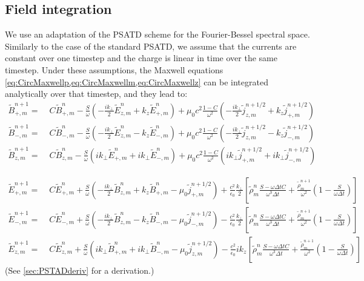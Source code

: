 \documentclass[a4paper]{article}   	%
\newcommand{\tB}[2]{\tilde{B}_{#1,m}^{#2}}
\newcommand{\tE}[2]{\tilde{E}_{#1,m}^{#2}}
\newcommand{\tj}[2]{\tilde{j}_{#1,m}^{#2}}
\newcommand{\trho}[1]{\tilde{\rho}_{m}^{#1}}
\begin{document}
\subsection{Field integration}
\label{sec:FieldIntegration}

We use an adaptation of the PSATD scheme \cite{Haber} for the
Fourier-Bessel spectral space. Similarly to the case of the standard
PSATD, we assume that the currents are constant over one timestep and
the charge is linear in time over the same timestep. Under these
assumptions, the Maxwell equations \cref{eq:CircMaxwellp,eq:CircMaxwellm,eq:CircMaxwellz} can be integrated
analytically over that timestep, and they lead to:
\begin{align*}
\tB{+}{n+1} = \; & C \tB{+}{n} - 
\frac{S}{\omega}\left(-\frac{ik_\perp }{2} \tE{z}{n} + k_z\tE{+}{n}
\right) + \mu_0 c^2\frac{1-C}{\omega^2} \left( -\frac{ik_\perp }{2}
  \tj{z}{n+1/2} + k_z \tj{+}{n+1/2} \right)& \\
\tB{-}{n+1} =\; & C \tB{-}{n} - 
\frac{S}{\omega}\left(- \frac{ik_\perp }{2} \tE{z}{n} - k_z\tE{-}{n}
\right) + \mu_0 c^2\frac{1-C}{\omega^2} \left( - \frac{ik_\perp }{2}
  \tj{z}{n+1/2} - k_z \tj{-}{n+1/2} \right) &\\
\tB{z}{n+1} =\; & C \tB{z}{n} - 
\frac{S}{\omega}\left(ik_\perp \tE{+}{n} + ik_\perp \tE{-}{n}
\right) + \mu_0 c^2\frac{1-C}{\omega^2} \left( ik_\perp
  \tj{+}{n+1/2} + ik_\perp \tj{-}{n+1/2} \right)&
\end{align*}

\begin{align*}
\tE{+}{n+1} = \; & C \tE{+}{n} + 
\frac{S}{\omega}\left(-\frac{ik_\perp }{2} \tB{z}{n} + k_z\tB{+}{n}
- \mu_0 \tj{+}{n+1/2} \right) + \frac{c^2}{\epsilon_0}
\frac{k_\perp}{2}\left[ \trho{n}\frac{S-\omega\Delta t
  C}{\omega^3\Delta t} + \frac{\trho{n+1}}{\omega^2}\left(
  1 - \frac{S}{\omega\Delta t}\right) \right]  & \\
\tE{-}{n+1} =\; & C \tE{-}{n} +
\frac{S}{\omega}\left(- \frac{ik_\perp }{2} \tB{z}{n} - k_z\tB{-}{n}
- \mu_0 \tj{-}{n+1/2} \right) - \frac{c^2}{\epsilon_0}
\frac{k_\perp}{2}\left[ \trho{n}\frac{S-\omega\Delta t
  C}{\omega^3\Delta t} + \frac{\trho{n+1}}{\omega^2}\left(
  1 - \frac{S}{\omega\Delta t}\right) \right]  &\\
\tE{z}{n+1} =\; & C \tE{z}{n} + 
\frac{S}{\omega}\left(ik_\perp \tB{+}{n} + ik_\perp \tB{-}{n}
- \mu_0 \tj{z}{n+1/2} \right) - \frac{c^2}{\epsilon_0}
ik_z\left[ \trho{n}\frac{S-\omega\Delta t
  C}{\omega^3\Delta t} + \frac{\trho{n+1}}{\omega^2}\left(
  1 - \frac{S}{\omega\Delta t}\right) \right]  &
\end{align*}
(See \cref{sec:PSTADderiv} for a derivation.)

\newpage
\appendix





\end{document}
